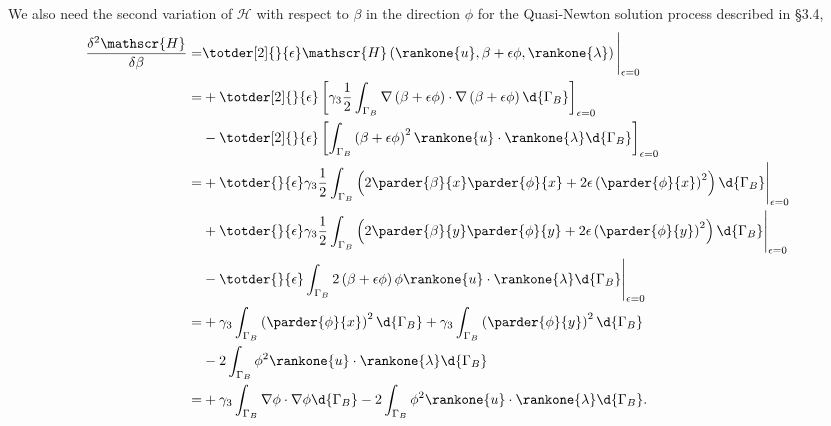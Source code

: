 We also need the second variation of $\mathscr{H}$ with respect to $\beta$ in the direction $\phi$ for the Quasi-Newton solution process described in \S3.4,
\begin{align*}
 \frac{\delta^2 \mathscr{H}}{\delta \beta} =& \totder[2]{}{\epsilon} \mathscr{H} \left(\rankone{u}, \beta + \epsilon \phi, \rankone{\lambda} \right) \Bigg|_{\epsilon = 0} \\
  =&+ \totder[2]{}{\epsilon} \left[ \gamma_3 \frac{1}{2} \int_{\Gamma_B} \nabla \left(\beta + \epsilon \phi \right) \cdot \nabla \left(\beta + \epsilon \phi \right) \d{\Gamma_B} \right]_{\epsilon = 0} \\
  &- \totder[2]{}{\epsilon} \left[ \int_{\Gamma_B} \left(\beta + \epsilon \phi\right)^2 \rankone{u} \cdot \rankone{\lambda} \d{\Gamma_B} \right]_{\epsilon = 0} \\
  =&+ \totder{}{\epsilon} \gamma_3 \frac{1}{2} \int_{\Gamma_B} \left(2\parder{\beta}{x}\parder{\phi}{x} + 2\epsilon \left(\parder{\phi}{x}\right)^2 \right) \d{\Gamma_B} \Bigg|_{\epsilon = 0} \\
  &+ \totder{}{\epsilon} \gamma_3 \frac{1}{2} \int_{\Gamma_B} \left(2\parder{\beta}{y}\parder{\phi}{y} + 2\epsilon \left(\parder{\phi}{y}\right)^2 \right) \d{\Gamma_B} \Bigg|_{\epsilon = 0} \\
  &- \totder{}{\epsilon} \int_{\Gamma_B} 2\left(\beta + \epsilon \phi\right)\phi \rankone{u} \cdot \rankone{\lambda} \d{\Gamma_B} \Bigg|_{\epsilon = 0} \\
  =&+ \gamma_3 \int_{\Gamma_B} \left(\parder{\phi}{x}\right)^2 \d{\Gamma_B} + \gamma_3 \int_{\Gamma_B} \left(\parder{\phi}{y}\right)^2 \d{\Gamma_B} \\
  &- 2 \int_{\Gamma_B} \phi^2 \rankone{u} \cdot \rankone{\lambda} \d{\Gamma_B} \\
  =&+ \gamma_3 \int_{\Gamma_B} \nabla \phi \cdot \nabla \phi \d{\Gamma_B} - 2 \int_{\Gamma_B} \phi^2 \rankone{u} \cdot \rankone{\lambda} \d{\Gamma_B}.
\end{align*}
